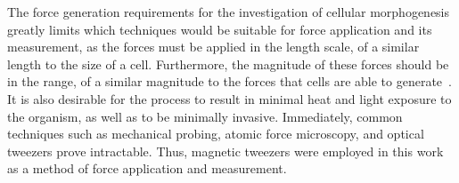 The force generation requirements for the investigation of cellular morphogenesis greatly limits which techniques would be suitable for force application and its measurement, as the forces must be applied in the  length scale, of a similar length to the size of a cell.
Furthermore, the magnitude of these forces should be in the  range, of a similar magnitude to the forces that cells are able to generate~\cite{}.
It is also desirable for the process to result in minimal heat and light exposure to the organism, as well as to be minimally invasive.
Immediately, common techniques such as mechanical probing, atomic force microscopy, and optical tweezers prove intractable.
Thus, magnetic tweezers were employed in this work as a method of force application and measurement.

